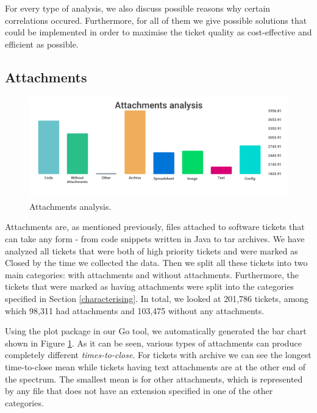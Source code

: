 \documentclass{mpaper}
\begin{document}
For every type of analysis, we also discuss possible reasons why certain correlations occured. Furthermore, for all 
of them we give possible solutions that could be implemented in order to maximise the ticket quality as cost-effective 
and efficient as possible.

\vskip30pt

\subsection{Attachments}

\begin{figure}[ht]
  \begin{center}
  \includegraphics[scale=0.25]{images/attachments.png}
  \end{center}
  \caption{\label{attachments}Attachments analysis.}
\end{figure}

Attachments are, as mentioned previously, files attached to software tickets that can take any form - from code 
snippets written in Java to tar archives. We have analyzed all tickets that were both of high priority tickets and
were marked as Closed by the time we collected the data. Then we split all these tickets into two main categories: 
with attachments and without attachments. Furthermore, the tickets that were marked as having attachments were split 
into the categories specified in Section \ref{characterising}. In total, we looked at 201,786 tickets, among which 
98,311 had attachments and 103,475 without any attachments.

Using the plot package in our Go tool, we automatically generated the bar chart shown in Figure \ref{attachments}. 
As it can be seen, various types of attachments can produce completely different \emph{times-to-close}. For 
tickets with archive we can see the longest time-to-close mean while tickets having text attachments are at 
the other end of the spectrum. The smallest mean is for other attachments, which is represented by any file 
that does not have an extension specified in one of the other categories. 
\end{document}
